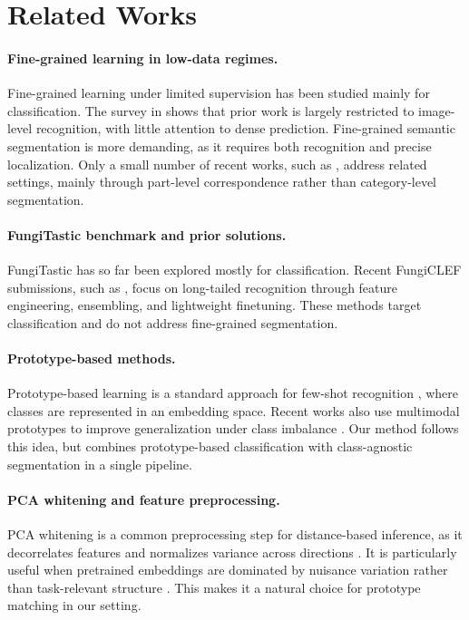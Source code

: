 \section{Related Works}

\paragraph{Fine-grained learning in low-data regimes.}
Fine-grained learning under limited supervision has been studied mainly for classification. The survey in \cite{tang2024awesome_fgfs} shows that prior work is largely restricted to image-level recognition, with little attention to dense prediction. Fine-grained semantic segmentation is more demanding, as it requires both recognition and precise localization. Only a small number of recent works, such as \cite{part_matching}, address related settings, mainly through part-level correspondence rather than category-level segmentation.

\paragraph{FungiTastic benchmark and prior solutions.}
FungiTastic \cite{Picek_2025_CVPR} has so far been explored mostly for classification. Recent FungiCLEF submissions, such as \cite{prototypical_networks, contrastive}, focus on long-tailed recognition through feature engineering, ensembling, and lightweight finetuning. These methods target classification and do not address fine-grained segmentation.

\paragraph{Prototype-based methods.}
Prototype-based learning is a standard approach for few-shot recognition \cite{proto1, proto2, proto3}, where classes are represented in an embedding space. Recent works also use multimodal prototypes to improve generalization under class imbalance \cite{multimodal}. Our method follows this idea, but combines prototype-based classification with class-agnostic segmentation in a single pipeline.

\paragraph{PCA whitening and feature preprocessing.}
PCA whitening is a common preprocessing step for distance-based inference, as it decorrelates features and normalizes variance across directions \cite{kessy2018optimal}. It is particularly useful when pretrained embeddings are dominated by nuisance variation rather than task-relevant structure \cite{anthony2026invisible, weng2022investigation}. This makes it a natural choice for prototype matching in our setting.